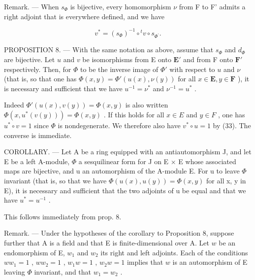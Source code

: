 Remark. --- When \(s_{\Phi}\) is bijective, every homomorphism \(\nu\) from F to F' admits a right adjoint that is everywhere defined, and we have

\[
v ^ {*} = (s _ {\Phi}) ^ {- 1} \circ {} ^ {t} v \circ s _ {\Phi^ {\prime}}.\tag{34}
\]

PROPOSITION 8. --- With the same notation as above, assume that \(s_{\Phi}\) and \(d_{\Phi}\) are bijective. Let \(u\) and \(v\) be isomorphisms from E onto \(\mathbf{E}'\) and from F onto \(\mathbf{F}'\) respectively. Then, for \(\Phi\) to be the inverse image of \(\Phi'\) with respect to \(u\) and \(\nu\) (that is, so that one has \(\Phi(x,y)=\Phi'(u(x),\nu(y))\) for all \(x\in\mathbf{E},y\in\mathbf{F}\) ), it is necessary and sufficient that we have \(u^{-1}=\nu^{*}\) and \(\nu^{-1}=u^{*}\) .

Indeed \(\Phi'(u(x), v(y)) = \Phi(x, y)\) is also written \(\Phi(x, u^*(v(y))) = \Phi(x, y)\) . If this holds for all \(x \in E\) and \(y \in F\) , one has \(u^* \circ v = 1\) since \(\Phi\) is nondegenerate. We therefore also have \(v^* \circ u = 1\) by (33). The converse is immediate.

COROLLARY. --- Let A be a ring equipped with an antiautomorphism J, and let E be a left A-module, \(\Phi\) a sesquilinear form for J on E × E whose associated maps are bijective, and u an automorphism of the A-module E. For u to leave \(\Phi\) invariant (that is, so that we have \(\Phi(u(x), u(y)) = \Phi(x, y)\) for all x, y in E), it is necessary and sufficient that the two adjoints of u be equal and that we have \(u^{*} = u^{-1}\) .

This follows immediately from prop. 8.

Remark. --- Under the hypotheses of the corollary to Proposition 8, suppose further that A is a field and that E is finite-dimensional over A. Let \(w\) be an endomorphism of E, \(w_{1}\) and \(w_{2}\) its right and left adjoints. Each of the conditions \(ww_{1}=1\) , \(ww_{2}=1\) , \(w_{1}w=1\) , \(w_{2}w=1\) implies that \(w\) is an automorphism of E leaving \(\Phi\) invariant, and that \(w_{1}=w_{2}\) .

